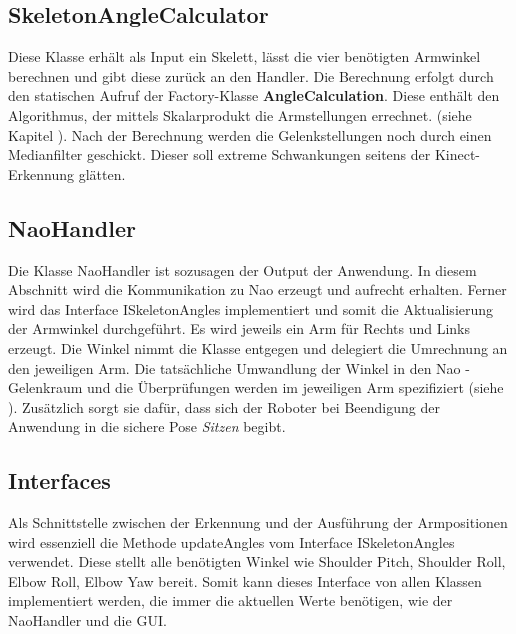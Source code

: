 %
%

\subsection{SkeletonAngleCalculator}
Diese Klasse erhält als Input ein Skelett, lässt die vier benötigten Armwinkel berechnen und gibt diese zurück an den Handler. Die Berechnung erfolgt durch den statischen Aufruf der Factory-Klasse \textbf{AngleCalculation}. Diese enthält den Algorithmus, der mittels Skalarprodukt die Armstellungen errechnet. (siehe Kapitel ). Nach der Berechnung werden die Gelenkstellungen noch durch einen Medianfilter geschickt. Dieser soll extreme Schwankungen seitens der Kinect-Erkennung glätten.

\subsection{NaoHandler}
Die Klasse \textsf{NaoHandler} ist sozusagen der Output der Anwendung. In diesem Abschnitt wird die Kommunikation zu Nao erzeugt und aufrecht erhalten. Ferner wird das Interface \textsf{ISkeletonAngles} implementiert und somit die Aktualisierung der Armwinkel durchgeführt. Es wird jeweils ein Arm für Rechts und Links erzeugt. Die Winkel nimmt die Klasse entgegen und delegiert die Umrechnung an den jeweiligen Arm. Die tatsächliche Umwandlung der Winkel in den Nao - Gelenkraum und die Überprüfungen werden im jeweiligen Arm spezifiziert (siehe ). Zusätzlich sorgt sie dafür, dass sich der Roboter bei Beendigung der Anwendung in die sichere Pose \textit{Sitzen} begibt.



\subsection{Interfaces}
Als Schnittstelle zwischen der Erkennung und der Ausführung der Armpositionen wird essenziell die Methode \textsf{updateAngles} vom Interface \textsf{ISkeletonAngles} verwendet. Diese stellt alle benötigten Winkel wie Shoulder Pitch, Shoulder Roll, Elbow Roll, Elbow Yaw bereit. Somit kann dieses Interface von allen Klassen implementiert werden, die immer die aktuellen Werte benötigen, wie der NaoHandler und die GUI.


